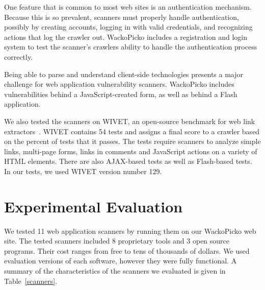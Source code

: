 One feature that is common to most web sites is an authentication
mechanism. Because this is so prevalent, scanners must properly handle
authentication, possibly by creating accounts, logging in with valid
credentials, and recognizing actions that log the crawler
out. WackoPicko includes a registration and login system to test the
scanner's crawlers ability to handle the authentication process correctly.

Being able to parse and understand 
client-side technologies presents a major challenge for web
application vulnerability scanners. WackoPicko includes
vulnerabilities behind a JavaScript-created form, as well as behind a
Flash application. 

We also tested the scanners on WIVET, an open-source 
benchmark for web link extractors~\cite{wivet}.  WIVET contains 54 tests and 
assigns a final score to a crawler based on the percent of tests that 
it passes. The tests require scanners to analyze
simple links, multi-page forms, links in comments
and JavaScript actions on a variety of HTML elements. There are also
AJAX-based tests as well as Flash-based tests. In our tests, we used WIVET 
version number 129.


\section{Experimental Evaluation}

We tested 11 web application scanners  by running them on our WackoPicko
web site. The tested scanners included 8 proprietary tools and 3 open
source programs. Their cost ranges from free to tens of thousands of
dollars. We used evaluation versions of each software, however they
were fully functional.
A summary of the characteristics of the scanners we evaluated is given
in Table~\ref{scanners}.

 

%
%

